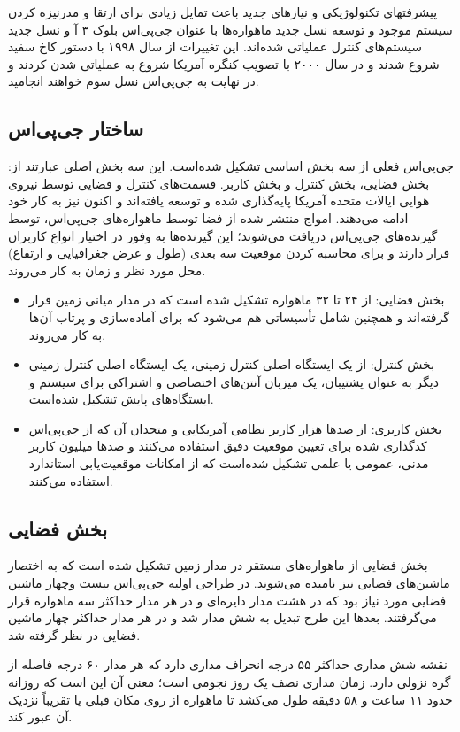 پیشرفتهای تکنولوژیکی و نیازهای جدید باعث تمایل زیادی برای ارتقا و مدرنیزه کردن سیستم موجود و توسعه نسل جدید ماهواره‌ها با عنوان جی‌پی‌اس بلوک ۳ آ و نسل جدید سیستم‌های کنترل عملیاتی شده‌اند. این تغییرات از سال ۱۹۹۸ با دستور کاخ سفید شروع شدند و در سال ۲۰۰۰ با تصویب کنگره آمریکا شروع به عملیاتی شدن کردند و در نهایت به جی‌پی‌اس نسل سوم خواهند انجامید.
\subsection{ساختار جی‌پی‌اس}
جی‌پی‌اس فعلی از سه بخش اساسی تشکیل شده‌است. این سه بخش اصلی عبارتند از: بخش فضایی، بخش کنترل و بخش کاربر. قسمت‌های کنترل و فضایی توسط نیروی هوایی ایالات متحده آمریکا پایه‌گذاری شده و توسعه یافته‌اند و اکنون نیز به کار خود ادامه می‌دهند. امواج منتشر شده از فضا توسط ماهواره‌های جی‌پی‌اس، توسط گیرنده‌های جی‌پی‌اس دریافت می‌شوند؛ این گیرنده‌ها به وفور در اختیار انواع کاربران قرار دارند و برای محاسبه کردن موقعیت سه بعدی (طول و عرض جغرافیایی و ارتفاع) محل مورد نظر و زمان به کار می‌روند.
\begin{itemize}
	\item
	بخش فضایی: از ۲۴ تا ۳۲ ماهواره تشکیل شده‌ است که در مدار میانی زمین قرار گرفته‌اند و همچنین شامل تأسیساتی هم می‌شود که برای آماده‌سازی و پرتاب آن‌ها به کار می‌روند.
	\item 
	
	بخش کنترل: از یک ایستگاه اصلی کنترل زمینی، یک ایستگاه اصلی کنترل زمینی دیگر به عنوان پشتیبان، یک میزبان آنتن‌های اختصاصی و اشتراکی برای سیستم و ایستگاه‌های پایش تشکیل شده‌است.
	
	\item  
	بخش کاربری: از صدها هزار کاربر نظامی آمریکایی و متحدان آن که از جی‌پی‌اس کدگذاری شده برای تعیین موقعیت دقیق استفاده می‌کنند و صدها میلیون کاربر مدنی، عمومی یا علمی تشکیل شده‌است که از امکانات موقعیت‌یابی استاندارد استفاده می‌کنند.
\end{itemize}
\subsection{بخش فضایی}
بخش فضایی از ماهواره‌های مستقر در مدار زمین تشکیل شده ‌است که به اختصار ماشین‌های فضایی نیز نامیده می‌شوند. در طراحی اولیه جی‌پی‌اس بیست وچهار ماشین فضایی مورد نیاز بود که در هشت  مدار دایره‌ای و در هر مدار حداکثر سه ماهواره قرار می‌گرفتند. بعدها این طرح تبدیل به شش مدار شد و در هر مدار حداکثر چهار ماشین فضایی در نظر گرفته شد.


نقشه شش مداری حداکثر ۵۵ درجه انحراف مداری دارد که هر مدار ۶۰ درجه فاصله از گره نزولی دارد. زمان مداری نصف یک روز نجومی است؛ معنی آن این است که روزانه حدود ۱۱ ساعت و ۵۸ دقیقه طول می‌کشد تا ماهواره از روی مکان قبلی یا تقریباً نزدیک آن عبور کند.



